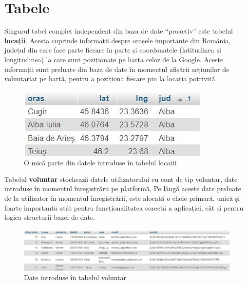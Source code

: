 \documentclass[12pt,a4paper]{report}
\begin{document}
\section{Tabele}
\par
Singurul tabel complet independent din baza de date “proactiv” este tabelul \textbf{locații}. Acesta cuprinde informații despre orașele importante din România, județul din care face parte fiecare în parte și coordonatele (latitudinea și longitudinea) la care sunt poziționate pe harta celor de la Google. Aceste informații sunt preluate din baza de date în momentul afișării acțiunilor de voluntariat pe hartă, pentru a poziționa fiecare pin la locația potrivită.
\\
\begin{figure}[H]
\centering
  \includegraphics[width=0.6\linewidth]{./imagini/locatii.jpg}
  \caption{O mică parte din datele introduse în tabelul locații}
\end{figure}

Tabelul \textbf{voluntar} stochează datele utilizatorului cu cont de tip voluntar, date introduse în momentul înregistrării pe platformă. Pe lângă aceste date preluate de la utilizator în momentul înregistrării, este alocată o cheie primară, unică și foarte importantă atât pentru funcționalitatea corectă a aplicației, cât și pentru logica structurii bazei de date.
\\
\begin{figure}[H]
\centering
  \includegraphics[width=1\linewidth]{./imagini/voluntar.jpg}
  \caption{Date introduse în tabelul voluntar}
\end{figure}


\newpage
\end{document}
